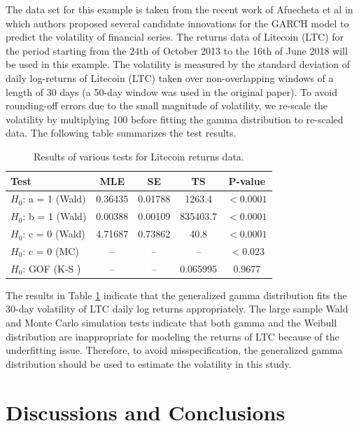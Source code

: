 \documentclass{ps}
\theoremstyle{plain}%
\theoremstyle{definition}
\theoremstyle{remark}
\begin{document}
The data set for this example is taken from the recent work of Afuecheta et al \cite{Afuecheta-2020} in which authors proposed several candidate innovations for the GARCH model to predict the volatility of financial series. The returns data of Litecoin (LTC) for the period starting from the 24th of October 2013 to the 16th of June 2018 will be used in this example. The volatility is measured by the standard deviation of daily log-returns of Litecoin (LTC) taken over non-overlapping windows of a length of 30 days (a 50-day window was used in the original paper). To avoid rounding-off errors due to the small magnitude of volatility, we re-scale the volatility by multiplying 100 before fitting the gamma distribution to re-scaled data. The following table summarizes the test results. 

\begin{center}
\begin{table}[h!]
	\caption{Results of various tests for Litecoin returns data. }
	{\begin{tabular}{lcccc} \hline
			Test                & MLE     &   SE    &  TS      & P-value         \\ \hline
			$H_0$: a = 1 (Wald)     & 0.36435 & 0.01788 & 1263.4   & $< 0.0001$      \\
			$H_0$: b = 1 (Wald)     & 0.00388 & 0.00109 & 835403.7 & $< 0.0001$      \\
			$H_0$: c = 0 (Wald)     & 4.71687 & 0.73862 & 40.8     & $< 0.0001$      \\
			$H_0$: c = 0  (MC)      &   --    &   --    &   --     & $< 0.023$      \\  
			$H_0$: GOF   (K-S )     &   --    &   --    & 0.065995 & 0.9677          \\ 
			\hline
	\end{tabular}}
	\label{Financial-risk-data}
\end{table}
\end{center}


The results in Table \ref{Financial-risk-data} indicate that the generalized gamma distribution fits the 30-day volatility of LTC daily log returns appropriately. The large sample Wald and Monte Carlo simulation tests indicate that both gamma and the Weibull distribution are inappropriate for modeling the returns of LTC because of the underfitting issue. Therefore, to avoid misspecification, the generalized gamma distribution should be used to estimate the volatility in this study. 


\section{Discussions and Conclusions}\label{sec10:conclusion}
\end{document}
